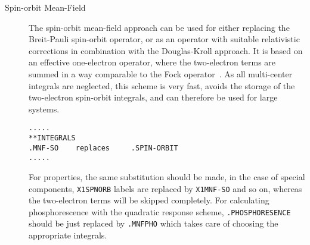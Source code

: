 \begin{description}
\begin{center}
\end{center}

\item[Spin-orbit Mean-Field] The spin-orbit mean-field approach can be used 
for either replacing the Breit-Pauli spin-orbit operator, or as an operator 
with suitable relativistic corrections in combination with the Douglas-Kroll 
approach. It is based on an effective one-electron operator, where the two-electron
terms are summed in a way comparable to the Fock operator~\cite{bahcmmuwogcpl251}. As all multi-center 
integrals are neglected, this scheme is very fast, avoids the storage of the 
two-electron spin-orbit integrals, and can therefore be used for large systems. 

\begin{verbatim}
.....
**INTEGRALS    
.MNF-SO    replaces     .SPIN-ORBIT             
.....
\end{verbatim}

For properties, the same substitution should be made, in the case of special 
components, \verb|X1SPNORB| labels are replaced by \verb|X1MNF-SO| and so on, whereas the 
two-electron terms will be skipped completely. For calculating phosphorescence with 
the quadratic response scheme, \verb|.PHOSPHORESENCE| should be just replaced by 
\verb|.MNFPHO| which takes care of choosing the appropriate integrals. 


\begin{center}
\end{center}



\end{description}
